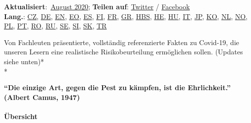 \textbf{Aktualisiert}:~\protect\hyperlink{latest}{August 2020};
\textbf{Teilen auf}:
\href{https://twitter.com/intent/tweet?url=https://swprs.org/covid-19-hinweis-ii/}{Twitter}
/
\href{https://www.facebook.com/share.php?u=https://swprs.org/covid-19-hinweis-ii/}{Facebook}\\
\textbf{Lang.}: \href{https://swprs.org/fakta-o-covid-19/}{CZ},
\href{https://swprs.org/covid-19-hinweis-ii/}{DE},
\href{https://swprs.org/a-swiss-doctor-on-covid-19/}{EN},
\href{https://swprs.org/faktoj-pri-kovim-19/}{EO},
\href{https://swprs.org/hechos-sobre-covid-19/}{ES},
\href{https://swprs.org/faktoja-covid-19sta/}{FI},
\href{https://swprs.org/coronavirus-un-medecin-suisse-parle/}{FR},
\href{https://swprs.org/facts-about-covid19-greek/}{GR},
\href{https://swprs.org/covid-19-cinjenice/}{HBS},
\href{https://yanivhamo.com/facts-about-covid-19-hebrew/}{HE},
\href{https://swprs.org/egy-svajci-orvos-a-covid-19-rol/}{HU},
\href{https://swprs.org/un-medico-svizzero-su-covid-19/}{IT},
\href{https://swprs.org/covid19-facts-japanese/}{JP},
\href{https://swprs.org/covid19-korean/}{KO},
\href{https://swprs.org/feiten-over-covid19/}{NL},
\href{https://midtifleisen.wordpress.com/2020/04/15/fakta-om-covid-19/}{NO},
\href{https://swprs.org/szwajcarski-lekarz-o-covid-19/}{PL},
\href{https://swprs.org/fatos-sobre-covid-19/}{PT},
\href{https://swprs.org/informatii-despre-covid-19/}{RO},
\href{https://swprs.org/\%d0\%bd\%d0\%b0-\%d0\%ba\%d0\%be\%d0\%b2\%d0\%b8\%d0\%b4-19/}{RU},
\href{https://swprs.org/fakta-om-covid-19/}{SE},
\href{http://www.ninamvseeno.org/pregled-clanka.aspx?naslov=pomembne-informacije-o-novem-koronavirusu-covid-19\&id=148}{SI},
\href{https://alatyr.sk/covid-19_swiss_propaganda_research.htm}{SK},
\href{https://swprs.org/isvicreli-bir-doktordan-kovid-19-uezerine/}{TR}

Von Fachleuten präsentierte, vollständig referenzierte Fakten zu
Covid-19, die unseren Lesern eine realistische Risikobeurteilung
ermöglichen sollen. (Updates siehe unten)*\\
*

\textbf{``Die einzige Art, gegen die Pest zu kämpfen, ist die
Ehrlichkeit.'' (Albert Camus, 1947)}

\hypertarget{uxfcbersicht}{%
\paragraph{Übersicht}\label{uxfcbersicht}}

